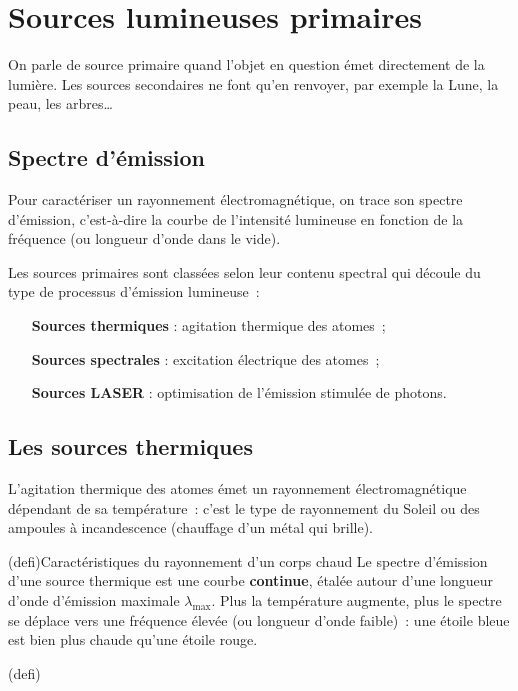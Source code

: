 \documentclass[../../main/main.tex]{subfiles}
\begin{document}
\section{Sources lumineuses primaires}

On parle de source primaire quand l'objet en question émet directement de la
lumière. Les sources secondaires ne font qu'en renvoyer, par exemple la Lune, la
peau, les arbres…

\subsection{Spectre d'émission}

Pour caractériser un rayonnement électromagnétique, on trace son spectre
d'émission, c'est-à-dire la courbe de l'intensité lumineuse en fonction de la
fréquence (ou longueur d'onde dans le vide).

Les sources primaires sont classées selon leur contenu spectral
qui découle du type de processus d'émission lumineuse~:
\begin{itemize}[leftmargin=120pt]
	\item[\textbf{Sources thermiques}] : agitation thermique des atomes~;
	\item[\textbf{Sources spectrales}] : excitation électrique des atomes~;
	\item[\textbf{Sources LASER}] : optimisation de l'émission stimulée de photons.
\end{itemize}

\subsection{Les sources thermiques}

L'agitation thermique des atomes émet un rayonnement électromagnétique dépendant
de sa température~: c'est le type de rayonnement du Soleil ou des ampoules à
incandescence (chauffage d'un métal qui brille).

\begin{tcb}(defi){Caractéristiques du rayonnement d'un corps chaud}
	Le spectre d'émission d'une source thermique est une courbe
	\textbf{continue}, étalée autour d'une longueur d'onde d'émission maximale
	$\lambda_{\max}$. Plus la température augmente, plus le spectre se déplace vers
	une fréquence élevée (ou longueur d'onde faible)~: une étoile bleue est bien
	plus chaude qu'une étoile rouge.
\end{tcb}(defi)
\end{document}
